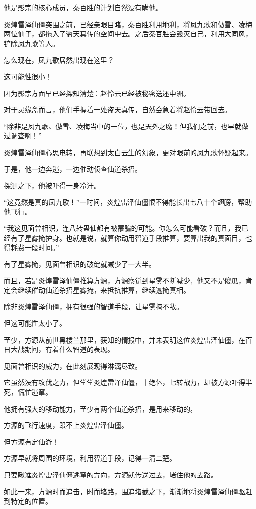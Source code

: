 \begin{this_body}
他是影宗的核心成员，秦百胜的计划自然没有瞒他。

炎煌雷泽仙僵突围之前，已经亲眼目睹，秦百胜利用地利，将凤九歌和傲雪、凌梅两位仙子，都拖入了盗天真传的空间中去。之后秦百胜会毁灭自己，利用大同风，铲除凤九歌等人。

怎么现在，凤九歌居然出现在这里？

这可能性很小！

因为影宗方面早已经探知清楚：赵怜云已经被秘密送还中洲。

对于灵缘斋而言，他们手握着一处盗天真传，自然会急着将赵怜云带回去。

“除非是凤九歌、傲雪、凌梅当中的一位，也是天外之魔！但我们之前，也早就做过调查啊！”

炎煌雷泽仙僵心思电转，再联想到太白云生的幻象，更对眼前的凤九歌怀疑起来。

于是，他一边奔逃，一边催动侦查仙道杀招。

探测之下，他被吓得一身冷汗。

“这竟然是真的凤九歌！”一时间，炎煌雷泽仙僵恨不得能长出七八十个翅膀，帮助他飞行。

“我这见面曾相识，连八转蛊仙都有被蒙骗的可能。你怎么可能看破？而且，我已经有了星雾掩护身。也就是说，就算你动用智道手段推算，要算出我的真面目，也得耗费一段时间。”

有了星雾掩，见面曾相识的破绽就减少了一大半。

而且，若是炎煌雷泽仙僵推算方源，方源察觉到星雾不断减少，他又不是傻瓜，肯定会继续催动仙道杀招星雾掩，来抵抗推算，继续遮掩真相。

除非炎煌雷泽仙僵，拥有很强的智道手段，让星雾掩不敌。

但这可能性太小了。

至少，方源从前世黑楼兰那里，获知的情报中，并未表明这位炎煌雷泽仙僵，在百日大战期间，有着什么智道的表现。

见面曾相识的威力，在此刻展现得淋漓尽致。

它虽然没有攻伐之力，但堂堂炎煌雷泽仙僵，十绝体，七转战力，却被方源吓得半死，慌忙逃窜。

他拥有强大的移动能力，至少有两个仙道杀招，是用来移动的。

方源的飞行速度，跟不上炎煌雷泽仙僵。

但方源有定仙游！

方源早就将周围的环境，利用智道手段，记得一清二楚。

只要瞅准炎煌雷泽仙僵逃窜的方向，方源就传送过去，堵住他的去路。

如此一来，方源时而追击，时而堵路，围追堵截之下，渐渐地将炎煌雷泽仙僵驱赶到特定的位置。


\end{this_body}
